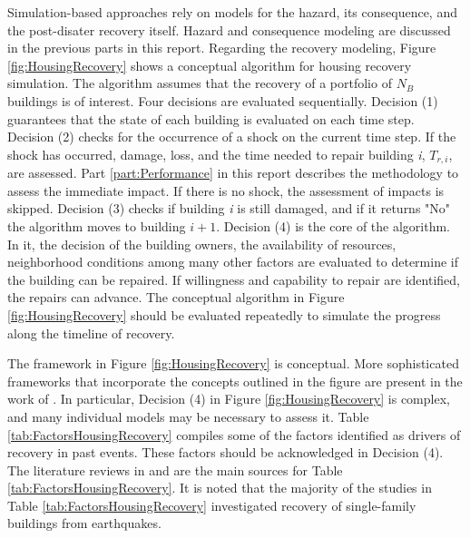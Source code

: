 Simulation-based approaches rely on models for the hazard, its consequence, and the post-disater recovery itself. Hazard and consequence modeling are discussed in the previous parts in this report. Regarding the recovery modeling, Figure \ref{fig:HousingRecovery} shows a conceptual algorithm for housing recovery simulation. The algorithm assumes that the recovery of a portfolio of $N_B$ buildings is of interest. Four decisions are evaluated sequentially. Decision (1) guarantees that the state of each building is evaluated on each time step. Decision (2) checks for the occurrence of a shock on the current time step. If the shock has occurred, damage, loss, and the time needed to repair building \textit{i}, $T_{r,i}$, are assessed. Part \ref{part:Performance} in this report describes the methodology to assess the immediate impact. If there is no shock, the assessment of impacts is skipped. Decision (3) checks if building \textit{i} is still damaged, and if it returns "No" the algorithm moves to building $i+1$. Decision (4) is the core of the algorithm. In it, the decision of the building owners, the availability of resources, neighborhood conditions among many other factors are evaluated to determine if the building can be repaired. If willingness and capability to repair are identified, the repairs can advance. The conceptual algorithm in Figure \ref{fig:HousingRecovery} should be evaluated repeatedly to simulate the progress along the timeline of recovery.\ 

The framework in Figure \ref{fig:HousingRecovery} is conceptual. More sophisticated frameworks that incorporate the concepts outlined in the figure are present in the work of \cite{Sutley2017a, Burton2018, costa2020housing}. In particular, Decision (4) in Figure \ref{fig:HousingRecovery} is complex, and many individual models may be necessary to assess it. Table \ref{tab:FactorsHousingRecovery} compiles some of the factors identified as drivers of recovery in past events. These factors should be acknowledged in Decision (4). The literature reviews in \cite{Costa2019thesis} and \cite{moradi2020recovus} are the main sources for Table \ref{tab:FactorsHousingRecovery}. It is noted that the majority of the studies in Table \ref{tab:FactorsHousingRecovery} investigated recovery of single-family buildings from earthquakes. \ 

